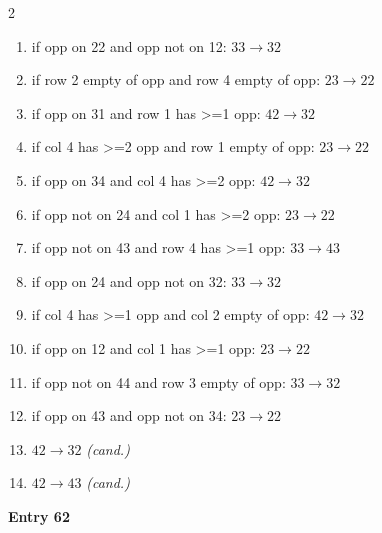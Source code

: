 \begin{multicols}{2}
\begin{tikzpicture}[scale=0.24]
\end{tikzpicture}
\nopagebreak\begin{enumerate}[topsep=1pt,itemsep=0pt,parsep=0pt,leftmargin=2.2em,label=\arabic*.]
\item if opp on 22 and opp not on 12: $33\!\to\!32$
\item if row 2 empty of opp and row 4 empty of opp: $23\!\to\!22$
\item if opp on 31 and row 1 has >=1 opp: $42\!\to\!32$
\item if col 4 has >=2 opp and row 1 empty of opp: $23\!\to\!22$
\item if opp on 34 and col 4 has >=2 opp: $42\!\to\!32$
\item if opp not on 24 and col 1 has >=2 opp: $23\!\to\!22$
\item if opp not on 43 and row 4 has >=1 opp: $33\!\to\!43$
\item if opp on 24 and opp not on 32: $33\!\to\!32$
\item if col 4 has >=1 opp and col 2 empty of opp: $42\!\to\!32$
\item if opp on 12 and col 1 has >=1 opp: $23\!\to\!22$
\item if opp not on 44 and row 3 empty of opp: $33\!\to\!32$
\item if opp on 43 and opp not on 34: $23\!\to\!22$
\item $42\!\to\!32$ \hfill\textit{(cand.)}
\item $42\!\to\!43$ \hfill\textit{(cand.)}
\end{enumerate}\smallskip
\noindent\textbf{Entry 62} \; 
\end{multicols}
